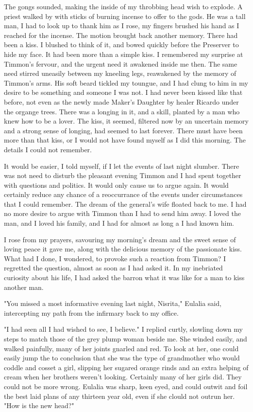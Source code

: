 \documentclass{article}
\begin{document}
The gongs sounded, making the inside of my throbbing head wish to explode. A priest walked by with sticks of burning incense to offer to the gods. He was a tall man, I had to look up to thank him as I rose, my fingers brushed his hand as I reached for the incense. The motion brought back another memory. There had been a kiss. I blushed to think of it, and bowed quickly before the Preserver to hide my face. It had been more than a simple kiss. I remembered my surprise at Timmon's fervour, and the urgent need it awakened inside me then. The same need stirred uneasily between my kneeling legs, reawakened by the memory of Timmon's arms. His soft beard tickled my toungue, and I had clung to him in my desire to be something and someone I was not. I had never been kissed like that before, not even as the newly made Maker's Daughter by healer Ricardo under the organge trees. There was a longing in it, and a skill, planted by a man who knew how to be a lover. The kiss, it seemed, filtered now by an uncertain memory and a strong sense of longing, had seemed to last forever. There must have been more than that kiss, or I would not have found myself as I did this morning. The details I could not remember. 

It would be easier, I told myself, if I let the events of last night slumber. There was not need to disturb the pleasant evening Timmon and I had spent together with questions and politics. It would only cause us to argue again. It would certainly reduce any chance of a reoccurrance of the events under circumstances that I could remember. The dream of the general's wife floated back to me. I had no more desire to argue with Timmon than I had to send him away. I loved the man, and I loved his family, and I had for almost as long a I had known him. 

I rose from my prayers, savouring my morning's dream and the sweet sense of loving peace it gave me, along with the delicious memory of the passionate kiss. What had I done, I wondered, to provoke such a reaction from Timmon? I regretted the question, almost as soon as I had asked it. In my inebriated curiosity about his life, I had asked the barron what it was like for a man to kiss another man.

\vspace{.5cm}

"You missed a most informative evening last night, Nisrita," Eulalia said, intercepting my path from the infirmary back to my office. 

"I had seen all I had wished to see, I believe." I replied curtly, slowling down my steps to match those of the grey plump woman beside me. She winded easily, and walked painfully, many of her joints gnarled and red. To look at her, one could easily jump the to conclusion that she was the type of grandmother who would coddle and cosset a girl, slipping her sugared orange rinds and an extra helping of cream when her brothers weren't looking. Certainly many of her girls did. They could not be more wrong. Eulalia was sharp, keen eyed, and could outwit and foil the best laid plans of any thirteen year old, even if she clould not outrun her. "How is the new head?"
\end{document}
